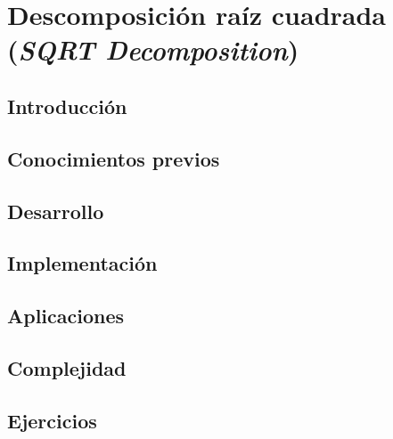 \chapter{Descomposición raíz cuadrada (\emph{SQRT Decomposition})}
\section{Introducción}

\section{Conocimientos previos}

\section{Desarrollo}

\section{Implementación}

\section{Aplicaciones}

\section{Complejidad}

\section{Ejercicios}
